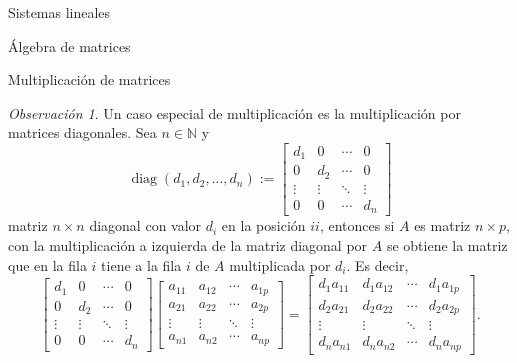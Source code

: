 \documentclass[a4paper,12pt,twoside,spanish,reqno]{amsbook}
\theoremstyle{definition}
\theoremstyle{remark}
\newtheorem{observacion}{Observaci\'on}[section]
\begin{document}
\begin{chapter}{Sistemas lineales}
\begin{section}{Álgebra de matrices}
\begin{subsection}{Multiplicación de matrices}
                \begin{observacion}\label{obs-mult-matrices-diagonales}
                    Un  caso especial de multiplicación es la multiplicación por matrices diagonales. Sea $n \in \mathbb N$ y 
                \begin{equation*}
                    \operatorname{diag}(d_1,d_2,\ldots,d_n) := \begin{bmatrix}
                    d_1 & 0 & \cdots &0 \\
                    0 & d_2 & \cdots &0 \\
                    \vdots & \vdots & \ddots &\vdots \\
                    0 & 0 & \cdots & d_n 
                    \end{bmatrix}
                \end{equation*}
                matriz $n \times n$ diagonal con valor $d_i$  en la posición $ii$,  entonces si $A$ es matriz $n \times p$,  con la multiplicación a izquierda de la matriz diagonal por $A$  se obtiene la matriz que en la fila $i$ tiene a la fila $i$ de $A$ multiplicada por $d_i$.  Es decir,
                \begin{equation*}
                \begin{bmatrix}
                d_1 & 0 & \cdots &0 \\
                0 & d_2 & \cdots &0 \\
                \vdots & \vdots & \ddots &\vdots \\
                0 & 0 & \cdots & d_n 
                \end{bmatrix}
                \begin{bmatrix}
                a_{11} & a_{12} & \cdots &a_{1p} \\
                a_{21} & a_{22} & \cdots &a_{2p}\\
                \vdots & \vdots & \ddots &\vdots \\
                a_{n1} & a_{n2} & \cdots & a_{np} 
                \end{bmatrix}
                =
                \begin{bmatrix}
                d_1a_{11} & d_1a_{12} & \cdots &d_1a_{1p} \\
                d_2a_{21} & d_2a_{22} & \cdots &d_2a_{2p}\\
                \vdots & \vdots & \ddots &\vdots \\
                d_n a_{n1} & d_n a_{n2} & \cdots & d_n a_{np} 
                \end{bmatrix}.

\end{equation*}
\end{observacion}
\end{subsection}
\end{section}
\end{chapter}
\end{document}
